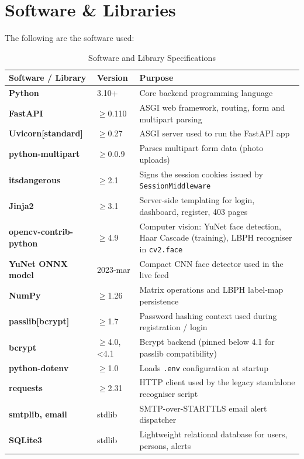 \documentclass[11pt]{report}
\begin{document}
\section{Software \& Libraries}
The following are the software used:

\begin{table}[h]
\centering
\renewcommand{\arraystretch}{1.5}
\begin{tabular}{|p{}|p{}|p{}|}
\hline
\textbf{Software / Library} & \textbf{Version} & \textbf{Purpose} \\
\hline
\textbf{Python} & 3.10+ & Core backend programming language \\
\hline
\textbf{FastAPI} & $\geq$0.110 & ASGI web framework, routing, form and multipart parsing \\
\hline
\textbf{Uvicorn[standard]} & $\geq$0.27 & ASGI server used to run the FastAPI app \\
\hline
\textbf{python-multipart} & $\geq$0.0.9 & Parses multipart form data (photo uploads) \\
\hline
\textbf{itsdangerous} & $\geq$2.1 & Signs the session cookies issued by \texttt{SessionMiddleware} \\
\hline
\textbf{Jinja2} & $\geq$3.1 & Server-side templating for login, dashboard, register, 403 pages \\
\hline
\textbf{opencv-contrib-python} & $\geq$4.9 & Computer vision: YuNet face detection, Haar Cascade (training), LBPH recogniser in \texttt{cv2.face} \\
\hline
\textbf{YuNet ONNX model} & 2023-mar & Compact CNN face detector used in the live feed \\
\hline
\textbf{NumPy} & $\geq$1.26 & Matrix operations and LBPH label-map persistence \\
\hline
\textbf{passlib[bcrypt]} & $\geq$1.7 & Password hashing context used during registration / login \\
\hline
\textbf{bcrypt} & $\geq$4.0,\,<4.1 & Bcrypt backend (pinned below 4.1 for passlib compatibility) \\
\hline
\textbf{python-dotenv} & $\geq$1.0 & Loads \texttt{.env} configuration at startup \\
\hline
\textbf{requests} & $\geq$2.31 & HTTP client used by the legacy standalone recogniser script \\
\hline
\textbf{smtplib, email} & stdlib & SMTP-over-STARTTLS email alert dispatcher \\
\hline
\textbf{SQLite3} & stdlib & Lightweight relational database for users, persons, alerts \\
\hline
\end{tabular}
\caption{Software and Library Specifications}
\label{tab:software_libs}
\end{table}
\end{document}
